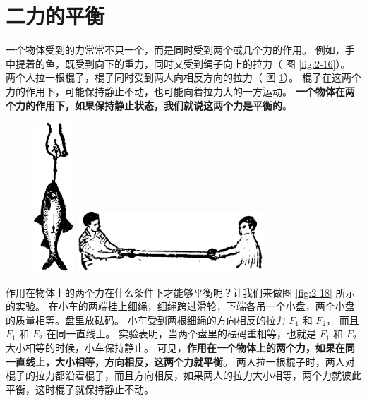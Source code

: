\section{二力的平衡}\label{sec:2-7}

一个物体受到的力常常不只一个，而是同时受到两个或几个力的作用。
例如，手中提着的鱼，既受到向下的重力，同时又受到绳子向上的拉力（ 图 \ref{fig:2-16}）。
两个人拉一根棍子，棍子同时受到两人向相反方向的拉力（ 图 \ref{fig:2-17}）。
棍子在这两个力的作用下，可能保持静止不动，也可能向着拉力大的一方运动。
\textbf{一个物体在两个力的作用下，如果保持静止状态，我们就说这两个力是平衡的}。

\begin{figure}[htbp]
    \centering
    \begin{minipage}{2cm}
    \centering
    \includegraphics[width=1.5cm]{../pic/czwl1-ch2-16}
    \caption{}\label{fig:2-16}
    \end{minipage}
    \qquad
    \begin{minipage}{7cm}
    \centering
    \includegraphics[width=7cm]{../pic/czwl1-ch2-17}
    \caption{}\label{fig:2-17}
    \end{minipage}
\end{figure}


作用在物体上的两个力在什么条件下才能够平衡呢？让我们来做图 \ref{fig:2-18} 所示的实验。
在小车的两端挂上细绳，细绳跨过滑轮，下端各吊一个小盘，两个小盘的质量相等。盘里放砝码。
小车受到两根细绳的方向相反的拉力 $F_1$ 和 $F_2$， 而且 $F_1$ 和 $F_2$ 在同一直线上。
实验表明，当两个盘里的砝码重相等，也就是 $F_1$ 和 $F_2$ 大小相等的时候，小车保持静止。
可见，\textbf{作用在一个物体上的两个力，如果在同一直线上，大小相等，方向相反，这两个力就平衡}。
两人拉一根棍子时，两人对棍子的拉力都沿着棍子，而且方向相反，如果两人的拉力大小相等，两个力就彼此平衡，这时棍子就保持静止不动。

